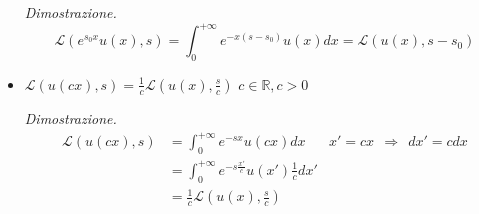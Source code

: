 \begin{itemize}
\textit{Dimostrazione.}\begin{equation*}
\mathcal{L}\left( e^{s_{0} x} u( x) ,s\right) =\int ^{+\infty }_{0} e^{-x( s-s_{0})} u( x) dx=\mathcal{L}( u( x) ,s-s_{0})
\end{equation*}
\item $\boxed{\mathcal{L}( u( cx) ,s) =\frac{1}{c}\mathcal{L}\left( u( x) ,\frac{s}{c}\right)}$ $\boxed{c\in \mathbb{R} ,c >0}$

\textit{Dimostrazione.}\begin{equation*}
\begin{aligned}
\mathcal{L}( u( cx) ,s) & =\int ^{+\infty }_{0} e^{-sx} u( cx) dx & x'=cx\ \ \Rightarrow \ \ dx'=cdx\\
 & =\int ^{+\infty }_{0} e^{-s\frac{x'}{c}} u( x')\frac{1}{c} dx' & \\
 & =\frac{1}{c}\mathcal{L}\left( u( x) ,\frac{s}{c}\right) & 
\end{aligned}
\end{equation*}
\end{itemize}
